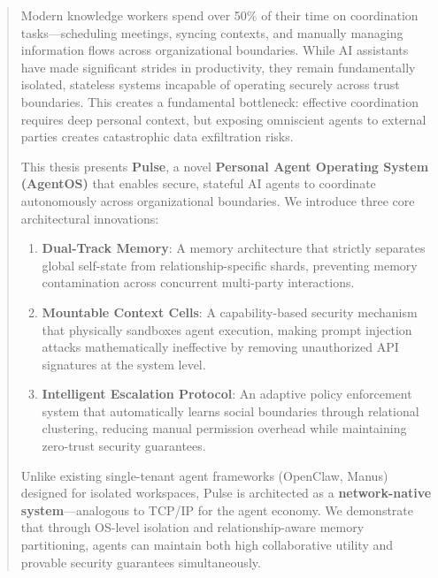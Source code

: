 \begin{abstract}


Modern knowledge workers spend over 50\% of their time on coordination tasks—scheduling meetings, syncing contexts, and manually managing information flows across organizational boundaries. While AI assistants have made significant strides in productivity, they remain fundamentally isolated, stateless systems incapable of operating securely across trust boundaries. This creates a fundamental bottleneck: effective coordination requires deep personal context, but exposing omniscient agents to external parties creates catastrophic data exfiltration risks.

This thesis presents \textbf{Pulse}, a novel \textbf{Personal Agent Operating System (AgentOS)} that enables secure, stateful AI agents to coordinate autonomously across organizational boundaries. We introduce three core architectural innovations:

\begin{enumerate}
    \item \textbf{Dual-Track Memory}: A memory architecture that strictly separates global self-state from relationship-specific shards, preventing memory contamination across concurrent multi-party interactions.

    \item \textbf{Mountable Context Cells}: A capability-based security mechanism that physically sandboxes agent execution, making prompt injection attacks mathematically ineffective by removing unauthorized API signatures at the system level.

    \item \textbf{Intelligent Escalation Protocol}: An adaptive policy enforcement system that automatically learns social boundaries through relational clustering, reducing manual permission overhead while maintaining zero-trust security guarantees.
\end{enumerate}

Unlike existing single-tenant agent frameworks (OpenClaw, Manus) designed for isolated workspaces, Pulse is architected as a \textbf{network-native system}—analogous to TCP/IP for the agent economy. We demonstrate that through OS-level isolation and relationship-aware memory partitioning, agents can maintain both high collaborative utility and provable security guarantees simultaneously.


\end{abstract}
